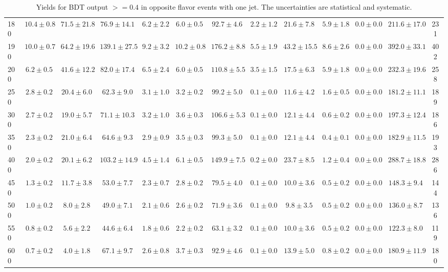 \begin{table}
{\begin{center}
\begin{tabular}{l | c c | c c c c c c c c  | c c}
180 & $10.4\pm0.8$ & $71.5\pm21.8$ & $76.9\pm14.1$ & $6.2\pm2.2$ & $6.0\pm0.5$ & $92.7\pm4.6$ & $2.2\pm1.2$ & $21.6\pm7.8$ & $5.9\pm1.8$ & $0.0\pm0.0$ & $211.6\pm17.0$ & 231 \\
190 & $10.0\pm0.7$ & $64.2\pm19.6$ & $139.1\pm27.5$ & $9.2\pm3.2$ & $10.2\pm0.8$ & $176.2\pm8.8$ & $5.5\pm1.9$ & $43.2\pm15.5$ & $8.6\pm2.6$ & $0.0\pm0.0$ & $392.0\pm33.1$ & 402 \\
200 & $6.2\pm0.5$ & $41.6\pm12.2$ & $82.0\pm17.4$ & $6.5\pm2.4$ & $6.0\pm0.5$ & $110.8\pm5.5$ & $3.5\pm1.5$ & $17.5\pm6.3$ & $5.9\pm1.8$ & $0.0\pm0.0$ & $232.3\pm19.6$ & 258 \\
250 & $2.8\pm0.2$ & $20.4\pm6.0$ & $62.3\pm9.0$ & $3.1\pm1.0$ & $3.2\pm0.2$ & $99.2\pm5.0$ & $0.1\pm0.0$ & $11.6\pm4.2$ & $1.6\pm0.5$ & $0.0\pm0.0$ & $181.2\pm11.1$ & 189 \\
300 & $2.7\pm0.2$ & $19.0\pm5.7$ & $71.1\pm10.3$ & $3.2\pm1.0$ & $3.6\pm0.3$ & $106.6\pm5.3$ & $0.1\pm0.0$ & $12.1\pm4.4$ & $0.6\pm0.2$ & $0.0\pm0.0$ & $197.3\pm12.4$ & 186 \\
350 & $2.3\pm0.2$ & $21.0\pm6.4$ & $64.6\pm9.3$ & $2.9\pm0.9$ & $3.5\pm0.3$ & $99.3\pm5.0$ & $0.1\pm0.0$ & $12.1\pm4.4$ & $0.4\pm0.1$ & $0.0\pm0.0$ & $182.9\pm11.5$ & 193 \\
400 & $2.0\pm0.2$ & $20.1\pm6.2$ & $103.2\pm14.9$ & $4.5\pm1.4$ & $6.1\pm0.5$ & $149.9\pm7.5$ & $0.2\pm0.0$ & $23.7\pm8.5$ & $1.2\pm0.4$ & $0.0\pm0.0$ & $288.7\pm18.8$ & 286 \\
450 & $1.3\pm0.2$ & $11.7\pm3.8$ & $53.0\pm7.7$ & $2.3\pm0.7$ & $2.8\pm0.2$ & $79.5\pm4.0$ & $0.1\pm0.0$ & $10.0\pm3.6$ & $0.5\pm0.2$ & $0.0\pm0.0$ & $148.3\pm9.4$ & 144 \\
500 & $1.0\pm0.2$ & $8.0\pm2.8$ & $49.0\pm7.1$ & $2.1\pm0.6$ & $2.6\pm0.2$ & $71.9\pm3.6$ & $0.1\pm0.0$ & $9.8\pm3.5$ & $0.5\pm0.2$ & $0.0\pm0.0$ & $136.0\pm8.7$ & 136 \\
550 & $0.8\pm0.2$ & $5.6\pm2.2$ & $44.6\pm6.4$ & $1.8\pm0.6$ & $2.2\pm0.2$ & $63.1\pm3.2$ & $0.1\pm0.0$ & $10.0\pm3.6$ & $0.5\pm0.2$ & $0.0\pm0.0$ & $122.3\pm8.0$ & 119 \\
600 & $0.7\pm0.2$ & $4.0\pm1.8$ & $67.1\pm9.7$ & $2.6\pm0.8$ & $3.7\pm0.3$ & $92.9\pm4.6$ & $0.1\pm0.0$ & $13.9\pm5.0$ & $0.8\pm0.2$ & $0.0\pm0.0$ & $180.9\pm11.9$ & 180 \\
\hline
\end{tabular}
\end{center}
\label{tab:yields_bdthi_1j}
\caption{Yields for BDT output $>=0.4$ in opposite flavor events with one jet. The uncertainties are statistical and systematic.}}
\end{table}

